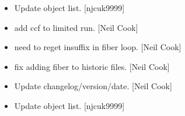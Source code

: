 \documentclass[a4paper,10pt,english]{report}
\begin{document}
\begin{itemize}
\item {} 
Update object list. {[}njcuk9999{]}

\item {} 
 \sphinxhyphen{} add ccf to limited
run. {[}Neil Cook{]}

\item {} 
 \sphinxhyphen{} need to re\sphinxhyphen{}get insuffix
in fiber loop. {[}Neil Cook{]}

\item {} 
 \sphinxhyphen{} fix adding fiber to historic files. {[}Neil
Cook{]}

\item {} 
Update changelog/version/date. {[}Neil Cook{]}

\item {} 
Update object list. {[}njcuk9999{]}

\end{itemize}
\end{document}
